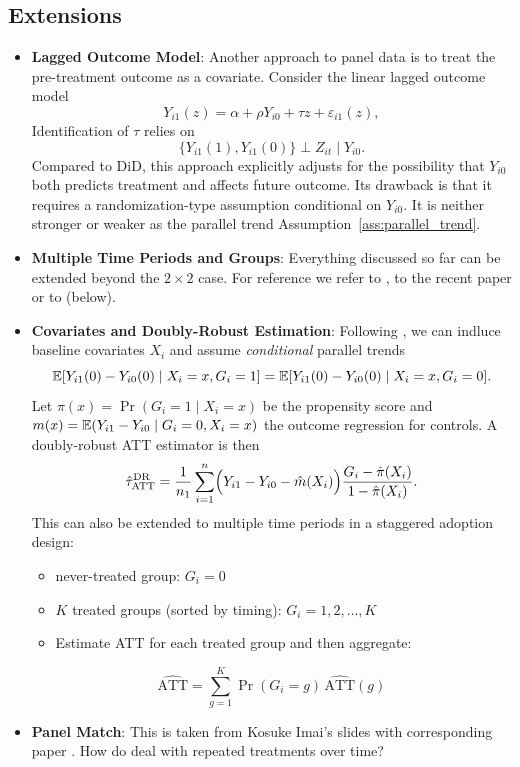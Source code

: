\documentclass[11pt]{exam}
\begin{document}
\subsection{Extensions}
\begin{itemize}
    \item \textbf{Lagged Outcome Model}: Another approach to panel data is to treat the pre-treatment outcome as a covariate. Consider the linear lagged outcome model
    \begin{equation}
    Y_{i1}(z) = \alpha + \rho Y_{i0} + \tau z + \varepsilon_{i1}(z),
    \end{equation}
    Identification of $\tau$ relies on
    \begin{equation}
    \{Y_{i1}(1),Y_{i1}(0)\} \perp Z_{it} \mid Y_{i0}.
    \end{equation}
     Compared to DiD, this approach explicitly adjusts for the possibility that $Y_{i0}$ both predicts treatment and affects future outcome. Its drawback is that it requires a randomization-type assumption conditional on $Y_{i0}$. It is neither stronger or weaker as the parallel trend Assumption~\ref{ass:parallel_trend}.
    \item \textbf{Multiple Time Periods and Groups}: Everything  discussed so far can be extended beyond the $2 \times 2$ case. For reference we refer to \citet[Chapter~13]{wagerathey2023causalinference}, to the recent paper \citet{borusyak2024revisiting} or to \citet{CALLAWAY2021200, imai2023matching} (below).
    \item \textbf{Covariates and Doubly-Robust Estimation}: Following \citet{CALLAWAY2021200}, we can indluce baseline covariates $X_i$ and assume \emph{conditional} parallel trends
\[
  \mathbb{E}[Y_{i1}(0)-Y_{i0}(0)\mid X_i=x,G_i=1]
  =
  \mathbb{E}[Y_{i1}(0)-Y_{i0}(0)\mid X_i=x,G_i=0].
\]
Let $\pi(x)=\Pr(G_i=1\mid X_i=x)$ be the propensity score and 
$m(x)=\mathbb{E}(Y_{i1}-Y_{i0}\mid G_i=0,X_i=x)$ the outcome regression for controls.  
A doubly-robust ATT estimator is then
\[
  \hat\tau_{\mathrm{ATT}}^{\text{DR}}
  = \frac{1}{n_1}
    \sum_{i=1}^n
    \Bigl(Y_{i1}-Y_{i0}-\hat m(X_i)\Bigr)
    \frac{G_i-\hat\pi(X_i)}{1-\hat\pi(X_i)}.
\]
This can also be extended to multiple time periods in a staggered adoption design:
\begin{itemize}
    \item never-treated group: $G_i = 0$
    \item $K$ treated groups (sorted by timing): $G_i = 1,2,\dots,K$
    \item Estimate ATT for each treated group and then aggregate:
  \end{itemize}
  \[
    \widehat{\text{ATT}}
    = \sum_{g=1}^K \Pr(G_i = g)\,\widehat{\text{ATT}}(g)
  \]
    \item \textbf{Panel Match}: This is taken from Kosuke Imai's slides with corresponding paper \citet{imai2023matching}. How do deal with repeated treatments over time?
    

\end{itemize}
\end{document}
